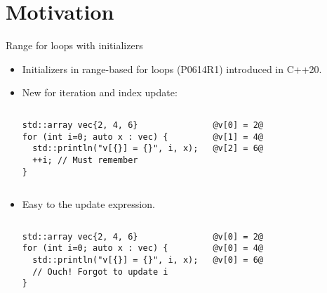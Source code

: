 \section{Motivation}

\begin{frame}[t,fragile]{Range for loops with initializers}
\begin{itemize}
  \item Initializers in range-based for loops (P0614R1) introduced in C++20.

  \item New  for iteration and index update:
\begin{columns}[T]

\begin{lstlisting}
std::array vec{2, 4, 6}
for (int i=0; auto x : vec) {
  std::println("v[{}] = {}", i, x);
  ++i; // Must remember
}
\end{lstlisting}

\begin{lstlisting}[style=terminal,escapechar=@]
@v[0] = 2@
@v[1] = 4@
@v[2] = 6@
\end{lstlisting}

\end{columns}

  \item Easy to  the update expression.
\begin{columns}[T]

\begin{lstlisting}
std::array vec{2, 4, 6}
for (int i=0; auto x : vec) {
  std::println("v[{}] = {}", i, x);
  // Ouch! Forgot to update i
}
\end{lstlisting}

\begin{lstlisting}[style=terminal,escapechar=@]
@v[0] = 2@
@v[0] = 4@
@v[0] = 6@
\end{lstlisting}

\end{columns}

\end{itemize}
\end{frame}
